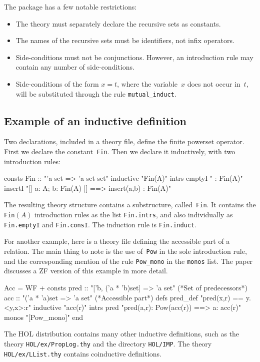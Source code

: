 The package has a few notable restrictions:
\begin{itemize}
\item The theory must separately declare the recursive sets as
  constants.

\item The names of the recursive sets must be identifiers, not infix
operators.  

\item Side-conditions must not be conjunctions.  However, an introduction rule
may contain any number of side-conditions.

\item Side-conditions of the form $x=t$, where the variable~$x$ does not
  occur in~$t$, will be substituted through the rule \verb|mutual_induct|.
\end{itemize}


\subsection{Example of an inductive definition}
Two declarations, included in a theory file, define the finite powerset
operator.  First we declare the constant~{\tt Fin}.  Then we declare it
inductively, with two introduction rules:
\begin{ttbox}
consts Fin :: "'a set => 'a set set"
inductive "Fin(A)"
  intrs
    emptyI  "{} : Fin(A)"
    insertI "[| a: A;  b: Fin(A) |] ==> insert(a,b) : Fin(A)"
\end{ttbox}
The resulting theory structure contains a substructure, called~{\tt Fin}.
It contains the {\tt Fin}$(A)$ introduction rules as the list {\tt Fin.intrs},
and also individually as {\tt Fin.emptyI} and {\tt Fin.consI}.  The induction
rule is {\tt Fin.induct}.

For another example, here is a theory file defining the accessible part of a
relation.  The main thing to note is the use of~{\tt Pow} in the sole
introduction rule, and the corresponding mention of the rule
\verb|Pow_mono| in the {\tt monos} list.  The paper discusses a ZF version
of this example in more detail.
\begin{ttbox}
Acc = WF + 
consts pred :: "['b, ('a * 'b)set] => 'a set"   (*Set of predecessors*)
       acc  :: "('a * 'a)set => 'a set"         (*Accessible part*)
defs   pred_def  "pred(x,r) == {y. <y,x>:r}"
inductive "acc(r)"
  intrs
     pred "pred(a,r): Pow(acc(r)) ==> a: acc(r)"
  monos   "[Pow_mono]"
end
\end{ttbox}
The HOL distribution contains many other inductive definitions, such as the
theory {\tt HOL/ex/PropLog.thy} and the directory {\tt HOL/IMP}.  The
theory {\tt HOL/ex/LList.thy} contains coinductive definitions.

